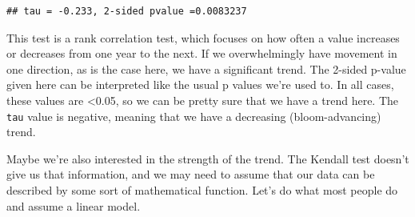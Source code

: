 \documentclass[
]{book}
\newenvironment{Shaded}{\begin{snugshade}}{\end{snugshade}}
\newcommand{\KeywordTok}[1]{\textcolor[rgb]{0.13,0.29,0.53}{\textbf{#1}}}
\newcommand{\NormalTok}[1]{#1}
\newcommand{\OperatorTok}[1]{\textcolor[rgb]{0.81,0.36,0.00}{\textbf{#1}}}
\newcommand{\StringTok}[1]{\textcolor[rgb]{0.31,0.60,0.02}{#1}}
\begin{document}
\begin{verbatim}
## tau = -0.233, 2-sided pvalue =0.0083237
\end{verbatim}

This test is a rank correlation test, which focuses on how often a value increases or decreases from one year to the next. If we overwhelmingly have movement in one direction, as is the case here, we have a significant trend. The 2-sided p-value given here can be interpreted like the usual p values we're used to. In all cases, these values are \textless0.05, so we can be pretty sure that we have a trend here. The \texttt{tau} value is negative, meaning that we have a decreasing (bloom-advancing) trend.

Maybe we're also interested in the strength of the trend. The Kendall test doesn't give us that information, and we may need to assume that our data can be described by some sort of mathematical function. Let's do what most people do and assume a linear model.

\begin{Shaded}
\end{Shaded}
\end{document}
